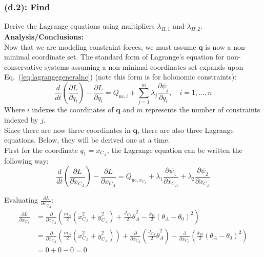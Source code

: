 \documentclass[titlepage]{article}
\begin{document}
\subsubsection*{(d.2): Find}
Derive the Lagrange equations using multipliers $\lambda_{H,1}$ and $\lambda_{H,2}$.\\

\textbf{Analysis/Conclusions:}\\
Now that we are modeling constraint forces, we must assume $\boldsymbol{q}$ is now a non-minimal coordinate set. The standard form of Lagrange's equation for non-conservative systems assuming a non-minimal coordinates set expands upon Eq.~(\ref{eq:lagrangegeneralnc}) (note this form is for holonomic constraints):
\begin{equation}
	\frac{d}{dt}\left(\frac{\partial L}{\partial\dot{q}_i}\right)-\frac{\partial L}{\partial q_i}=Q_{\text{nc},i}+\sum_{j=1}^{m}\lambda_j\frac{\partial\psi_j}{\partial q_i},\quad i=1,...,n
\end{equation}
Where $i$ indexes the coordinates of $\boldsymbol{q}$ and $m$ represents the number of constraints indexed by $j$.\\

Since there are now three coordinates in $\boldsymbol{q}$, there are also three Lagrange equations. Below, they will be derived one at a time.\\

First for the coordinate $q_1=x_{C_A}$, the Lagrange equation can be written the following way:
\begin{equation}
	\frac{d}{dt}\left(\frac{\partial L}{\partial\dot{x}_{C_A}}\right)-\frac{\partial L}{\partial x_{C_A}}=Q_{\text{nc},x_{C_A}}+\lambda_1\frac{\partial\psi_1}{\partial x_{C_A}}+\lambda_2\frac{\partial\psi_2}{\partial x_{C_A}}
	\label{eq:xca}
\end{equation}

Evaluating $\frac{\partial L}{\partial x_{C_A}}$:
\begin{equation}
	\begin{split}
		\frac{\partial L}{\partial x_{C_A}}&=\frac{\partial}{\partial x_{C_A}}\left(\frac{m_A}{2}\left(\dot{x}_{C_A}^2+\dot{y}_{C_A}^2\right)+\frac{J_{C_A}}{2}\dot{\theta}_A^2-\frac{k_H}{2}(\theta_A-\theta_0)^2\right) \\
		&=\frac{\partial}{\partial x_{C_A}}\left(\frac{m_A}{2}\left(\dot{x}_{C_A}^2+\dot{y}_{C_A}^2\right)\right)+\frac{\partial}{\partial x_{C_A}}\left(\frac{J_{C_A}}{2}\dot{\theta}_A^2\right)-\frac{\partial}{\partial x_{C_A}}\left(\frac{k_H}{2}(\theta_A-\theta_0)^2\right) \\
		&=0+0-0=0 \\
	\end{split}
\end{equation}
\end{document}
